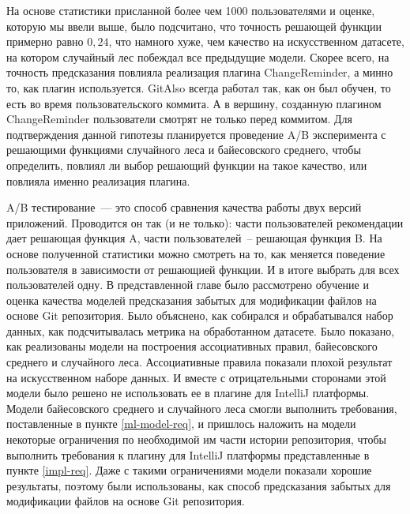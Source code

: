 На основе статистики присланной более чем 1000 пользователями и оценке, которую мы ввели выше, было подсчитано, что точность решающей функции примерно равно $0,24$, что намного хуже, чем качество на искусственном датасете, на котором случайный лес побеждал все предыдущие модели. Скорее всего, на точность предсказания повлияла реализация плагина ChangeReminder, а минно то, как плагин используется. GitAlso всегда работал так, как он был обучен, то есть во время пользовательского коммита. А в вершину, созданную плагином ChangeReminder пользователи смотрят не только перед коммитом. Для подтверждения данной гипотезы планируется проведение A/B эксперимента с решающими функциями случайного леса и байесовского среднего, чтобы определить, повлиял ли выбор решающий функции на такое качество, или повлияла именно реализация плагина.

A/B тестирование~--- это способ сравнения качества работы двух версий приложений. Проводится он так (и не только): части пользователей рекомендации дает решающая функция A, части пользователей~-- решающая функция B. На основе полученной статистики можно смотреть на то, как меняется поведение пользователя в зависимости от решающией функции. И в итоге выбрать для всех пользователей одну.
\chapterconclusion
В представленной главе было рассмотрено обучение и оценка качества моделей предсказания забытых для модификации файлов на основе Git репозитория. Было объяснено, как собирался и обрабатывался набор данных, как подсчитывалась метрика на обработанном датасете. Было показано, как реализованы модели на построения ассоциативных правил, байесовского среднего и случайного леса. Ассоциативные правила показали плохой результат на искусственном наборе данных. И вместе с отрицательными сторонами этой модели было решено не использовать ее в плагине для IntelliJ платформы. Модели байесовского среднего и случайного леса смогли выполнить требования, поставленные в пункте \ref{ml-model-req}, и пришлось наложить на модели некоторые ограничения по необходимой им части истории репозитория, чтобы выполнить требования к плагину для IntelliJ платформы представленные в пункте \ref{impl-req}. Даже с такими ограничениями модели показали хорошие результаты, поэтому были использованы, как способ предсказания забытых для модификации файлов на основе Git репозитория.